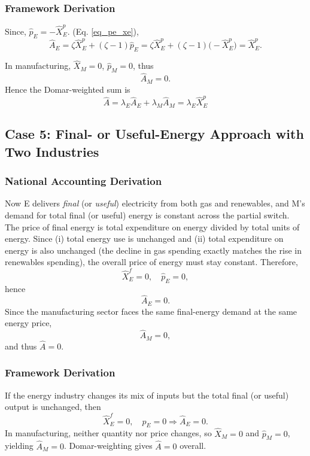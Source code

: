 \documentclass[11pt]{article}
\begin{document}
\subsubsection{Framework Derivation}

Since, $\hat{p}_E= - \hat{X}_E^p.$ (Eq. \ref{eq_pe_xe}),
\begin{equation*}
      \hat{A}_E
= \zeta \hat{X}_E^p + (\zeta-1) \hat{p}_E
= \zeta \hat{X}_E^p + (\zeta-1)\bigl(-\hat{X}_E^p\bigr)
= \hat{X}_E^p.
\end{equation*}

In manufacturing, $\hat{X}_M=0$, $\hat{p}_M=0$, thus
\[
    \hat{A}_M=0.
\]
Hence the Domar-weighted sum is
\[
    \hat{A}
= \lambda_E \hat{A}_E
  + \lambda_M \hat{A}_M
= \lambda_E \hat{X}_E^p
\]


\subsection{Case 5: Final- or Useful-Energy Approach with Two Industries}
\label{subappendix_final_energy_two_sectors}
\subsubsection{National Accounting Derivation}

Now E delivers \emph{final} (or \emph{useful}) electricity from both gas and renewables, and M's demand for total final (or useful) energy is constant across the partial switch. The price of final energy is total expenditure on energy divided by total units of energy. Since (i) total energy use is unchanged and (ii) total expenditure on energy is also unchanged (the decline in gas spending exactly matches the rise in renewables spending), the overall price of energy must stay constant. 
Therefore,
\[
    \hat{X}_E^f
= 0,
    \quad
    \hat{p}_E= 0,
\]
hence
\[
    \hat{A}_E=0.
\]
Since the manufacturing sector faces the same final-energy demand at the same energy price,
\[
    \hat{A}_M=0,
\]
and thus $\hat{A}=0$.

\subsubsection{Framework Derivation}

If the energy industry changes its mix of inputs but the total final (or useful) output is unchanged, then
\[
   \hat{X}_E^f = 0,
   \quad
   \hat{p}_E = 0
    \Longrightarrow 
   \hat{A}_E=0.
\]
In manufacturing, neither quantity nor price changes, so $\hat{X}_M=0$ and $\hat{p}_M=0$, yielding $\hat{A}_M=0$. Domar-weighting gives $\hat{A}=0$ overall.
\end{document}
